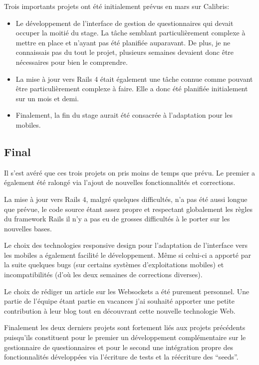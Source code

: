 \documentclass[12pt,a4paper]{book}
\begin{document}
Trois importants projets ont été initialement prévus en mars sur Calibris:
\begin{itemize}
	\item Le développement de l'interface de gestion de questionnaires qui devait occuper la moitié du stage. La tâche semblant particulièrement complexe à mettre en place et n'ayant pas été planifiée auparavant. De plus, je ne connaissais pas du tout le projet, plusieurs semaines devaient donc être nécessaires pour bien le comprendre.
	\item La mise à jour vers Rails 4 était également une tâche connue comme pouvant être particulièrement complexe à faire. Elle a donc été planifiée initialement sur un mois et demi.
	\item Finalement, la fin du stage aurait été consacrée à l'adaptation pour les mobiles.
\end{itemize}

\subsection{Final}

Il s'est avéré que ces trois projets on pris moins de temps que prévu. Le premier a également été ralongé via l'ajout de nouvelles fonctionnalités et corrections.

La mise à jour vers Rails 4, malgré quelques difficultés, n'a pas été aussi longue que prévue, le code source étant assez propre et respectant globalement les règles du framework Rails il n'y a pas eu de grosses difficultés à le porter sur les nouvelles bases.

Le choix des technologies responsive design pour l'adaptation de l'interface vers les mobiles a également facilité le développement. Même si celui-ci a apporté par la suite quelques bugs (sur certains systèmes d'exploitations mobiles) et incompatibilités (d'où les deux semaines de corrections diverses).

Le choix de rédiger un article sur les Websockets a été purement personnel. Une partie de l'équipe étant partie en vacances j'ai souhaité apporter une petite contribution à leur blog tout en découvrant cette nouvelle technologie Web.

Finalement les deux derniers projets sont fortement liés aux projets précédents puisqu'ils constituent pour le premier un développement complémentaire sur le gestionnaire de questionnaires et pour le second une intégration propre des fonctionnalités développées via l'écriture de tests et la réécriture des ``seeds''.
\end{document}
